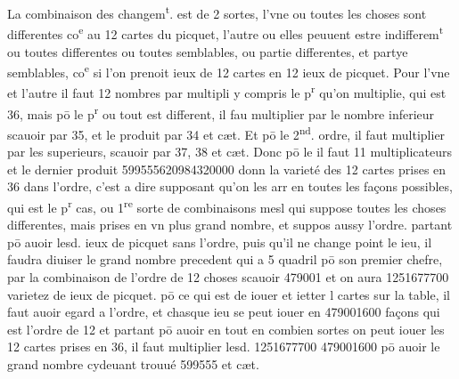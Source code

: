 \documentclass[11pt,a4paper]{article}
\begin{document}
La combinaison des changem\textsuperscript{t}. est de 2 sortes, l'vne ou toutes les choses sont differentes co\textsuperscript{e} au 12 cartes du picquet, l'autre ou elles peuuent estre indifferem\textsuperscript{t} ou toutes differentes ou toutes semblables, ou partie differentes, et partye semblables, co\textsuperscript{e} si l'on prenoit  ieux de 12 cartes en 12 ieux de picquet. Pour l'vne et l'autre il faut  12 nombres par multipli y compris le p\textsuperscript{r} qu'on multiplie, qui est 36, mais pō le p\textsuperscript{r} ou tout est different, il fau multiplier par le nombre inferieur scauoir par 35, et le produit par 34 et cæt. Et pō le 2\textsuperscript{nd}. ordre, il faut multiplier par les superieurs, scauoir par 37, 38 et cæt. Donc pō le \ill{} il faut  11 multiplicateurs et le dernier produit  599555620984320000 donn la varieté des 12 cartes prises en 36 dans l'ordre, c'est a dire supposant qu'on les arr\ill{} en toutes les façons possibles, qui est le p\textsuperscript{r} cas, ou 1\textsuperscript{re} sorte de combinaisons mesl\ill{} qui suppose toutes les choses differentes, mais prises en vn plus grand nombre, et suppos aussy l'ordre. partant pō auoir lesd. ieux de picquet sans l'ordre, puis qu'il ne change point le ieu, il faudra diuiser le grand nombre precedent qui a 5 quadril\ill{} pō son premier chefre, par la combinaison de l'ordre de 12 choses scauoir 479001\ill{} et on aura 1251677700 varietez de ieux de picquet. pō ce qui est de iouer et ietter l cartes sur la table, il faut auoir egard a l'ordre, et chasque ieu se peut iouer en 479001600 façons qui est l'ordre de 12 et partant pō auoir en tout en combien \ill{} sortes on peut iouer les 12 cartes prises en 36, il faut multiplier lesd. 1251677700 \ill{} 479001600 pō auoir le grand nombre cydeuant trouué 599555 et cæt.
\end{document}
